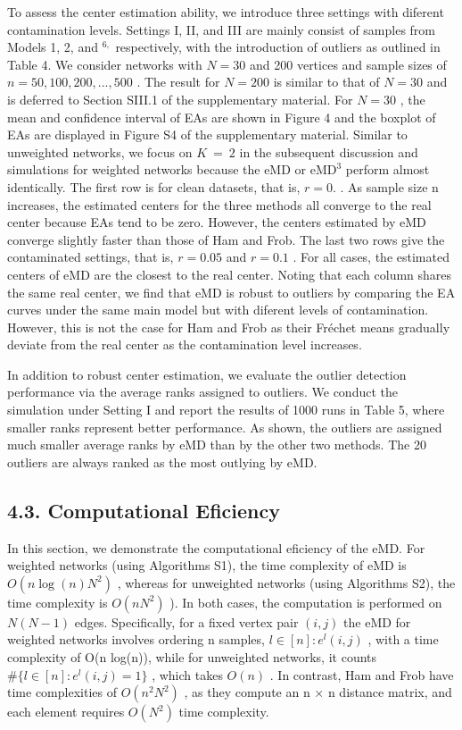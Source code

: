 \documentclass[
  10
]{article}
\begin{document}
To assess the center estimation ability, we introduce three settings
with diferent contamination levels. Settings I, II, and III are mainly
consist of samples from Models 1, 2, and \(^ { 6 , }\) respectively,
with the introduction of outliers as outlined in Table 4. We consider
networks with \(N = 3 0\) and 200 vertices and sample sizes of
\(n = 5 0 , 1 0 0 , 2 0 0 , . . . , 5 0 0\) . The result for
\(N = 2 0 0\) is similar to that of \(N = 3 0\) and is deferred to
Section SIII.1 of the supplementary material. For \(N = 3 0\) , the mean
and confidence interval of EAs are shown in Figure 4 and the boxplot of
EAs are displayed in Figure S4 of the supplementary material. Similar to
unweighted networks, we focus on \(K \ = \ 2\) in the subsequent
discussion and simulations for weighted networks because the eMD or
\(\mathrm { e M D } ^ { 3 }\) perform almost identically. The first row
is for clean datasets, that is, \(r = 0 .\) . As sample size n
increases, the estimated centers for the three methods all converge to
the real center because EAs tend to be zero. However, the centers
estimated by eMD converge slightly faster than those of Ham and Frob.
The last two rows give the contaminated settings, that is,
\(r = 0 . 0 5\) and \(r = 0 . 1\) . For all cases, the estimated centers
of eMD are the closest to the real center. Noting that each column
shares the same real center, we find that eMD is robust to outliers by
comparing the EA curves under the same main model but with diferent
levels of contamination. However, this is not the case for Ham and Frob
as their Fréchet means gradually deviate from the real center as the
contamination level increases.

In addition to robust center estimation, we evaluate the outlier
detection performance via the average ranks assigned to outliers. We
conduct the simulation under Setting I and report the results of 1000
runs in Table 5, where smaller ranks represent better performance. As
shown, the outliers are assigned much smaller average ranks by eMD than
by the other two methods. The 20 outliers are always ranked as the most
outlying by eMD.

\subsection{4.3. Computational Eficiency}\label{computational-eficiency}

In this section, we demonstrate the computational eficiency of the eMD.
For weighted networks (using Algorithms S1), the time complexity of eMD
is \(O ( n \log ( n ) N ^ { 2 } )\) , whereas for unweighted networks
(using Algorithms S2), the time complexity is \(O ( n N ^ { 2 } )\) ).
In both cases, the computation is performed on \(N ( N - 1 )\) edges.
Specifically, for a fixed vertex pair \(( i , j )\) the eMD for weighted
networks involves ordering n samples,
\(l \in [ n ] : e ^ { l } ( i , j )\) , with a time complexity of O(n
log(n)), while for unweighted networks, it counts
\(\# \{ l \in [ n ] : e ^ { l } ( i , j ) = 1 \}\) , which takes
\(O ( n )\) . In contrast, Ham and Frob have time complexities of
\(O ( n ^ { 2 } N ^ { 2 } )\) , as they compute an n × n distance
matrix, and each element requires \(O ( N ^ { 2 } )\) time complexity.
\end{document}
